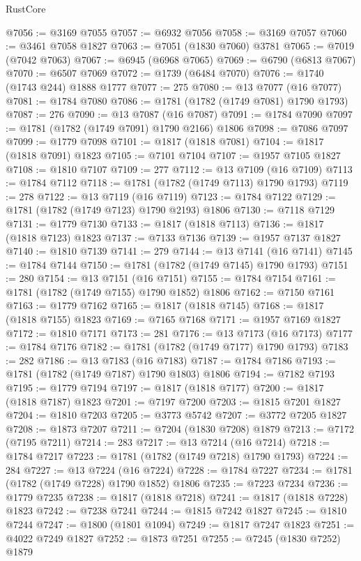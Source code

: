 \begin{lexlean}{RustCore}
\begin{coremodule}
@7056 := @3169 @7055
@7057 := @6932 @7056
@7058 := @3169 @7057
@7060 := @3461 @7058 @1827
@7063 := @7051 (@1830 @7060) @3781
@7065 := @7019 (@7042 @7063)
@7067 := @6945 (@6968 @7065)
@7069 := @6790 (@6813 @7067)
@7070 := @6507 @7069
@7072 := @1739 (@6484 @7070)
@7076 := @1740 (@1743 @244) @1888 @1777
@7077 := 275
@7080 := @13 @7077 (@16 @7077)
@7081 := @1784 @7080
@7086 := @1781 (@1782 (@1749 @7081) @1790 @1793)
@7087 := 276
@7090 := @13 @7087 (@16 @7087)
@7091 := @1784 @7090
@7097 := @1781 (@1782 (@1749 @7091) @1790 @2166) @1806
@7098 := @7086 @7097
@7099 := @1779 @7098
@7101 := @1817 (@1818 @7081)
@7104 := @1817 (@1818 @7091) @1823
@7105 := @7101 @7104
@7107 := @1957 @7105 @1827
@7108 := @1810 @7107
@7109 := 277
@7112 := @13 @7109 (@16 @7109)
@7113 := @1784 @7112
@7118 := @1781 (@1782 (@1749 @7113) @1790 @1793)
@7119 := 278
@7122 := @13 @7119 (@16 @7119)
@7123 := @1784 @7122
@7129 := @1781 (@1782 (@1749 @7123) @1790 @2193) @1806
@7130 := @7118 @7129
@7131 := @1779 @7130
@7133 := @1817 (@1818 @7113)
@7136 := @1817 (@1818 @7123) @1823
@7137 := @7133 @7136
@7139 := @1957 @7137 @1827
@7140 := @1810 @7139
@7141 := 279
@7144 := @13 @7141 (@16 @7141)
@7145 := @1784 @7144
@7150 := @1781 (@1782 (@1749 @7145) @1790 @1793)
@7151 := 280
@7154 := @13 @7151 (@16 @7151)
@7155 := @1784 @7154
@7161 := @1781 (@1782 (@1749 @7155) @1790 @1852) @1806
@7162 := @7150 @7161
@7163 := @1779 @7162
@7165 := @1817 (@1818 @7145)
@7168 := @1817 (@1818 @7155) @1823
@7169 := @7165 @7168
@7171 := @1957 @7169 @1827
@7172 := @1810 @7171
@7173 := 281
@7176 := @13 @7173 (@16 @7173)
@7177 := @1784 @7176
@7182 := @1781 (@1782 (@1749 @7177) @1790 @1793)
@7183 := 282
@7186 := @13 @7183 (@16 @7183)
@7187 := @1784 @7186
@7193 := @1781 (@1782 (@1749 @7187) @1790 @1803) @1806
@7194 := @7182 @7193
@7195 := @1779 @7194
@7197 := @1817 (@1818 @7177)
@7200 := @1817 (@1818 @7187) @1823
@7201 := @7197 @7200
@7203 := @1815 @7201 @1827
@7204 := @1810 @7203
@7205 := @3773 @5742
@7207 := @3772 @7205 @1827
@7208 := @1873 @7207
@7211 := @7204 (@1830 @7208) @1879
@7213 := @7172 (@7195 @7211)
@7214 := 283
@7217 := @13 @7214 (@16 @7214)
@7218 := @1784 @7217
@7223 := @1781 (@1782 (@1749 @7218) @1790 @1793)
@7224 := 284
@7227 := @13 @7224 (@16 @7224)
@7228 := @1784 @7227
@7234 := @1781 (@1782 (@1749 @7228) @1790 @1852) @1806
@7235 := @7223 @7234
@7236 := @1779 @7235
@7238 := @1817 (@1818 @7218)
@7241 := @1817 (@1818 @7228) @1823
@7242 := @7238 @7241
@7244 := @1815 @7242 @1827
@7245 := @1810 @7244
@7247 := @1800 (@1801 @1094)
@7249 := @1817 @7247 @1823
@7251 := @4022 @7249 @1827
@7252 := @1873 @7251
@7255 := @7245 (@1830 @7252) @1879

\end{coremodule}
\end{lexlean}
